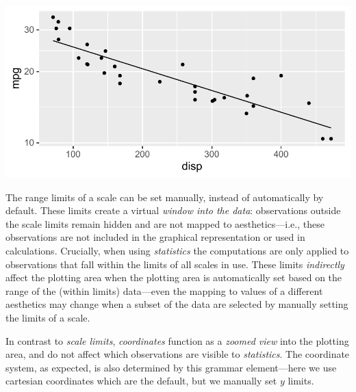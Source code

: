 \documentclass[krantz2]{krantz}\usepackage{knitr}
\begin{document}
\begin{knitrout}\footnotesize
{}\color{fgcolor}\begin{kframe}
\begin{alltt}
\hlstd{(} 
       \hlstd{(}    \hlopt{+}
  \hlstd{()} \hlopt{+}
  \hlstd{(} \hlstd{=} \hlstd{,}  \hlstd{=} \hlstd{)} \hlopt{+}
  \hlstd{()}
\end{alltt}
\end{kframe}

{\centering \includegraphics[width=.7\textwidth]{figure/pos-ggplot-basics-06-1} 

}



\end{knitrout}

The range limits of a scale can be set manually, instead of automatically by default. These limits create a virtual \emph{window into the data}: observations outside the scale limits remain hidden and are not mapped to aesthetics---i.e., these observations are not included in the graphical representation or used in calculations. Crucially, when using \emph{statistics} the computations are only applied to observations that fall within the limits of all scales in use. These limits \emph{indirectly} affect the plotting area when the plotting area is automatically set based on the range of the (within limits) data---even the mapping to values of a different aesthetics may change when a subset of the data are selected by manually setting the limits of a scale.

In contrast to \emph{scale limits}, \emph{coordinates} function as a \emph{zoomed view} into the plotting area, and do not affect which observations are visible to \emph{statistics}. The coordinate system, as expected, is also determined by this grammar element---here we use cartesian coordinates which are the default, but we manually set $y$ limits.
\end{document}
